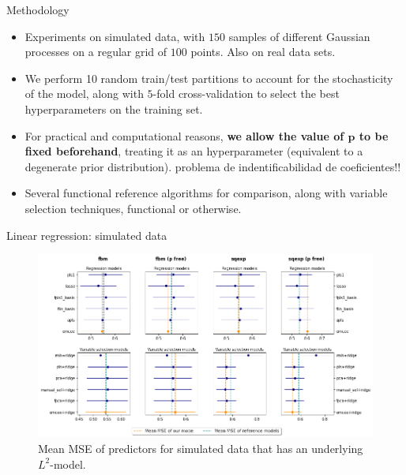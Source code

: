 \documentclass[10pt, english, professionalfonts]{beamer}
\begin{document}
\begin{frame}{Methodology}
  \begin{itemize}
    \item Experiments on simulated data, with \(150\) samples of different Gaussian processes on a regular grid of \(100\) points. Also on real data sets.
    \item We perform 10 random train/test partitions to account for the stochasticity of the model, along with \(5\)-fold cross-validation to select the best hyperparameters on the training set.
    \item For practical and computational reasons, \textbf{we allow the value of \(\bm{p}\) to be fixed beforehand}, treating it as an hyperparameter (equivalent to a degenerate prior distribution). {\color{red} problema de indentificabilidad de coeficientes!!}
    \item Several functional reference algorithms for comparison, along with variable selection techniques, functional or otherwise.

  \end{itemize}
\end{frame}

\begin{frame}{Linear regression: simulated data}
  \vspace{1em}
  \begin{figure}
    \includegraphics[width=\textwidth]{img/reg_emcee_l2}
    \caption{Mean MSE of predictors for simulated data that has an underlying \(L^2\)-model.}
  \end{figure}
\end{frame}
\end{document}

